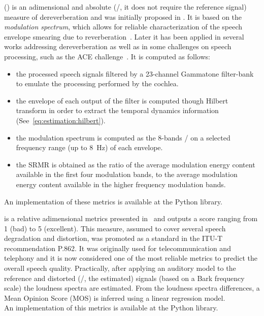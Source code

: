  (\DSRMR) is an adimensional and absolute (\ie/, it does not require the reference signal) measure of dereverberation and was initially proposed in .
It is based on the \textit{modulation spectrum}, which allows for reliable characterization of the speech envelope smearing due to reverberation~.
Later it has been applied in several works addressing dereverberation as well as in some challenges on speech processing, such as the ACE challenge~.
It is computed as follows:
\begin{itemize}
    \item the processed speech signals filtered by a 23-channel Gammatone filter-bank to emulate the processing performed by the cochlea.
    \item the envelope of each output of the filter is computed though Hilbert transform in order to extract the temporal dynamics information (See~\cref{eq:estimation:hilbert}).
    \item the modulation spectrum is computed as the 8-bands \STFT/ on a selected frequency range (up to 8~Hz) of each envelope.
    \item the \ac{SRMR} is obtained as the ratio of the average modulation energy content available in the first four modulation bands,
    to the average modulation energy content available in the higher frequency modulation bands.
\end{itemize}
An implementation of these metrics is available at the \href{https://github.com/aliutkus/speechmetrics/}{\ExternalLink} Python library.

 is a relative adimensional metrics presented in~ and outputs a score ranging from 1 (bad) to 5 (excellent).
This measure, assumed to cover several speech degradation and distortion, was promoted as a standard in the ITU-T recommendation P.862.
It was originally used for telecommunication and telephony and it is now considered one of the most reliable metrics to predict the overall speech quality.
Practically, after applying an auditory model to the reference and distorted (\ie/, the estimated) signals (based on a Bark frequency scale) the loudness spectra are estimated.
From the loudness spectra differences, a Mean Opinion Score (MOS) is inferred using a linear regression model.
\\An implementation of this metrics is available at the \href{https://github.com/aliutkus/speechmetrics/}{\ExternalLink} Python library.

